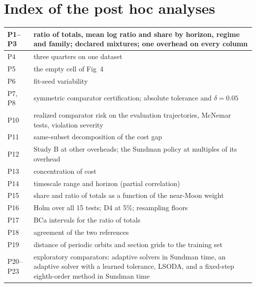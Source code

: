 \documentclass[10pt,letterpaper]{article}
\begin{document}
\section{Index of the post hoc analyses}
\label{sec:posthoc}
\begin{tabular}{|l|L{5.4in}|}
\hline
P1--P3 & ratio of totals, mean log ratio and share by horizon, regime and family; declared mixtures; one overhead on every column \\ \hline
P4 & three quarters on one dataset \\ \hline
P5 & the empty cell of Fig~4 \\ \hline
P6 & fit-seed variability \\ \hline
P7, P8 & symmetric comparator certification; absolute tolerance and $\delta = 0.05$ \\ \hline
P10 & realized comparator risk on the evaluation trajectories, McNemar tests, violation severity \\ \hline
P11 & same-subset decomposition of the cost gap \\ \hline
P12 & Study B at other overheads; the Sundman policy at multiples of its overhead \\ \hline
P13 & concentration of cost \\ \hline
P14 & timescale range and horizon (partial correlation) \\ \hline
P15 & share and ratio of totals as a function of the near-Moon weight \\ \hline
P16 & Holm over all 15 tests; D4 at 5\%; resampling floors \\ \hline
P17 & BCa intervals for the ratio of totals \\ \hline
P18 & agreement of the two references \\ \hline
P19 & distance of periodic orbits and section grids to the training set \\ \hline
P20--P23 & exploratory comparators: adaptive solvers in Sundman time, an adaptive solver with a learned tolerance, LSODA, and a fixed-step
eighth-order method in Sundman time \\ \hline
\end{tabular}
\end{document}
